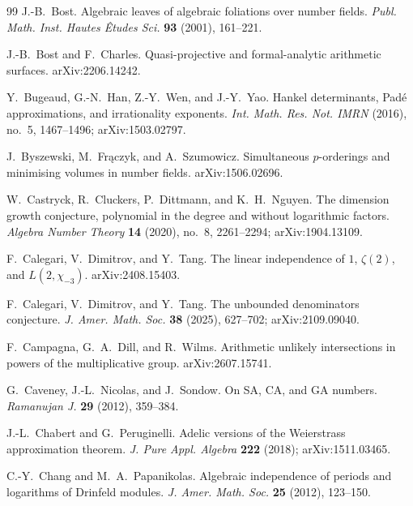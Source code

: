 \documentclass[10pt,letterpaper]{article}
\begin{document}
\begin{thebibliography}{99}
J.-B.~Bost.
\newblock Algebraic leaves of algebraic foliations over number fields.
\newblock \emph{Publ. Math. Inst. Hautes \^Etudes Sci.} \textbf{93} (2001), 161--221.

J.-B.~Bost and F.~Charles.
\newblock Quasi-projective and formal-analytic arithmetic surfaces.
\newblock arXiv:2206.14242.

Y.~Bugeaud, G.-N.~Han, Z.-Y.~Wen, and J.-Y.~Yao.
\newblock Hankel determinants, Pad\'e approximations, and irrationality exponents.
\newblock \emph{Int. Math. Res. Not. IMRN} (2016), no.~5, 1467--1496; arXiv:1503.02797.

J.~Byszewski, M.~Fr\k{a}czyk, and A.~Szumowicz.
\newblock Simultaneous $p$-orderings and minimising volumes in number fields.
\newblock arXiv:1506.02696.

W.~Castryck, R.~Cluckers, P.~Dittmann, and K.~H.~Nguyen.
\newblock The dimension growth conjecture, polynomial in the degree and without logarithmic factors.
\newblock \emph{Algebra Number Theory} \textbf{14} (2020), no.~8, 2261--2294; arXiv:1904.13109.

F.~Calegari, V.~Dimitrov, and Y.~Tang.
\newblock The linear independence of $1$, $\zeta(2)$, and $L(2,\chi_{-3})$.
\newblock arXiv:2408.15403.

F.~Calegari, V.~Dimitrov, and Y.~Tang.
\newblock The unbounded denominators conjecture.
\newblock \emph{J. Amer. Math. Soc.} \textbf{38} (2025), 627--702; arXiv:2109.09040.

F.~Campagna, G.~A.~Dill, and R.~Wilms.
\newblock Arithmetic unlikely intersections in powers of the multiplicative group.
\newblock arXiv:2607.15741.

G.~Caveney, J.-L.~Nicolas, and J.~Sondow.
\newblock On SA, CA, and GA numbers.
\newblock \emph{Ramanujan J.} \textbf{29} (2012), 359--384.

J.-L.~Chabert and G.~Peruginelli.
\newblock Adelic versions of the Weierstrass approximation theorem.
\newblock \emph{J. Pure Appl. Algebra} \textbf{222} (2018); arXiv:1511.03465.

C.-Y.~Chang and M.~A.~Papanikolas.
\newblock Algebraic independence of periods and logarithms of Drinfeld modules.
\newblock \emph{J. Amer. Math. Soc.} \textbf{25} (2012), 123--150.


\end{thebibliography}
\end{document}
